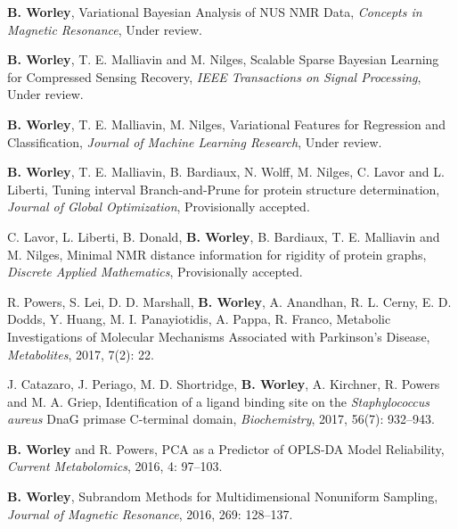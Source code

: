 \documentclass[letterpaper]{article}
\renewenvironment{itemize}{
  \begin{list}{}{
    \setlength{\leftmargin}{1.5em}
  }
}{
  \end{list}
}
\begin{document}
\begin{itemize}
 \item \textbf{B. Worley},
  Variational Bayesian Analysis of NUS NMR Data,
  \emph{Concepts in Magnetic Resonance},
  Under review.

 \item \textbf{B. Worley}, T. E. Malliavin and M. Nilges,
  Scalable Sparse Bayesian Learning for Compressed Sensing Recovery,
  \emph{IEEE Transactions on Signal Processing},
  Under review.

 \item \textbf{B. Worley}, T. E. Malliavin, M. Nilges,
  Variational Features for Regression and Classification,
  \emph{Journal of Machine Learning Research},
  Under review.

 \item \textbf{B. Worley}, T. E. Malliavin, B. Bardiaux, N. Wolff,
  M. Nilges, C. Lavor and L. Liberti, Tuning interval Branch-and-Prune
  for protein structure determination,
  \emph{Journal of Global Optimization},
  Provisionally accepted.

 \item C. Lavor, L. Liberti, B. Donald, \textbf{B. Worley},
  B. Bardiaux, T. E. Malliavin and M. Nilges, Minimal NMR distance
  information for rigidity of protein graphs,
  \emph{Discrete Applied Mathematics},
  Provisionally accepted.

 \item R. Powers, S. Lei, D. D. Marshall, \textbf{B. Worley}, A. Anandhan,
  R. L. Cerny, E. D. Dodds, Y. Huang, M. I. Panayiotidis, A. Pappa,
  R. Franco, Metabolic Investigations of Molecular Mechanisms
  Associated with Parkinson's Disease,
  \emph{Metabolites},
  2017, 7(2): 22.

 \item J. Catazaro, J. Periago, M. D. Shortridge, \textbf{B. Worley},
  A. Kirchner, R. Powers and M. A. Griep,
  Identification of a ligand binding site on the
  \emph{Staphylococcus aureus} DnaG primase C-terminal domain,
  \emph{Biochemistry}, 2017, 56(7): 932--943.

 \item \textbf{B. Worley} and R. Powers,
  PCA as a Predictor of OPLS-DA Model Reliability,
  \emph{Current Metabolomics},
  2016, 4: 97--103.

 \item \textbf{B. Worley},
  Subrandom Methods for Multidimensional Nonuniform Sampling,
  \emph{Journal of Magnetic Resonance},
  2016, 269: 128--137.


\end{itemize}
\end{document}
